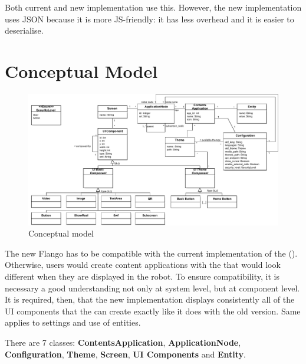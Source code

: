 Both current and new implementation use this.
However, the new implementation uses \ac{JSON} because it is more \ac{JS}-friendly: it has less overhead and it is easier to deserialise.

\section{Conceptual Model}
\begin{figure}   
    \centering
    \includegraphics[width=\textwidth]{figures/specification-conceptual-model}
    \caption{Conceptual model}
    \label{fig:specification-conceptual-model}
\end{figure}

The new Flango \cm has to be compatible with the current implementation of the \se (\flangofe).
Otherwise, users would create content applications with the \se that would look different when they are displayed in the robot.
To ensure compatibility, it is necessary a good understanding not only at system level, but at component level.
It is required, then, that the new implementation displays consistently all of the \ac{UI} components that the \se can create exactly like it does with the old version. 
Same applies to settings and use of entities.

There are 7 classes: \textbf{ContentsApplication}, \textbf{ApplicationNode}, \textbf{Configuration}, \textbf{Theme}, \textbf{Screen}, \textbf{UI Components} and \textbf{Entity}.

